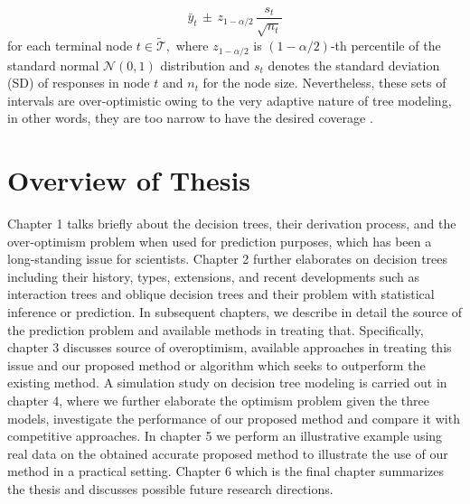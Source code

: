 \begin{equation}
\label{eqn-naive-ci}
\bar{y}_t \, \pm  \, z_{1-\alpha/2} \, \frac{s_t}{\sqrt{n_t}}
\end{equation} 
for each terminal node $t \in \widetilde{\mathcal{T}},$ where $z_{1-\alpha/2}$ is $(1-\alpha/2)$-th percentile of the standard normal $\mathcal{N}(0, 1)$ distribution and $s_t$ denotes the standard deviation (SD) of responses in node $t$ and $n_t$ for the node size. Nevertheless, these sets of intervals are over-optimistic owing to the very adaptive nature of tree modeling, in other words, they are too narrow to have the desired coverage .


\section{Overview of Thesis}
Chapter 1 talks briefly about the decision trees, their derivation process, and the over-optimism problem when used for prediction purposes, which has been a long-standing issue for scientists. Chapter 2 further elaborates on decision trees including their history, types, extensions, and recent developments such as interaction trees and oblique decision trees and their problem with statistical inference or prediction. In subsequent chapters, we describe in detail the source of the prediction problem and available methods in treating that. Specifically, chapter 3 discusses source of overoptimism, available approaches in treating this issue and our proposed method or algorithm which seeks to outperform the existing method. A simulation study on decision tree modeling is carried out in chapter 4, where we further elaborate the optimism problem given the three models, investigate the performance of our proposed method and compare it with competitive approaches. In chapter 5 we perform an illustrative example using real data on the obtained accurate proposed method to illustrate the use of our method in a practical setting. Chapter 6 which is the final chapter summarizes the thesis and discusses possible future research directions. 
